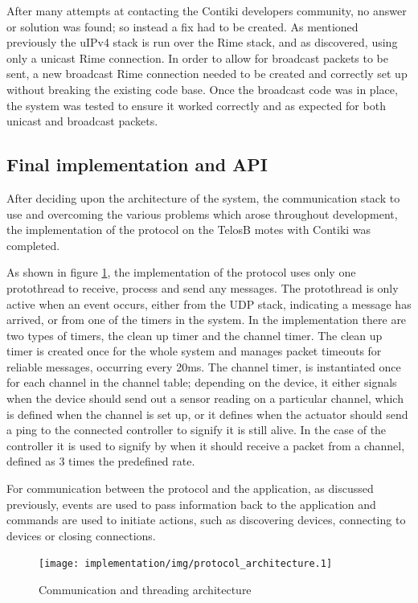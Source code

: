 After many attempts at contacting the Contiki developers community, no answer or solution was found; so instead a fix had to be created. As mentioned previously the uIPv4 stack is run over the Rime stack, and as discovered, using only a unicast Rime connection. In order to allow for broadcast packets to be sent, a new broadcast Rime connection needed to be created and correctly set up without breaking the existing code base. Once the broadcast code was in place, the system was tested to ensure it worked correctly and as expected for both unicast and broadcast packets.


\subsection{Final implementation and API}
After deciding upon the architecture of the system, the communication stack to use and overcoming the various problems which arose throughout development, the implementation of the protocol on the TelosB motes with Contiki was completed. 

As shown in figure \ref{fig:protocol_architecture}, the implementation of the protocol uses only one protothread to receive, process and send any messages. The protothread is only active when an event occurs, either from the UDP stack, indicating a message has arrived, or from one of the timers in the system. In the implementation there are two types of timers, the clean up timer and the channel timer. The clean up timer is created once for the whole system and manages packet timeouts for reliable messages, occurring every 20ms. The channel timer, is instantiated once for each channel in the channel table; depending on the device, it either signals when the device should send out a sensor reading on a particular channel, which is defined when the channel is set up, or it defines when the actuator should send a ping to the connected controller to signify it is still alive. In the case of the controller it is used to signify by when it should receive a packet from a channel, defined as 3 times the predefined rate.

For communication between the protocol and the application, as discussed previously, events are used to pass information back to the application and commands are used to initiate actions, such as discovering devices, connecting to devices or closing connections.

\begin{figure}[h!]
\centering
\texttt{[image: implementation/img/protocol\_architecture.1]}
\caption{Communication and threading architecture}
\label{fig:protocol_architecture}
\end{figure}

